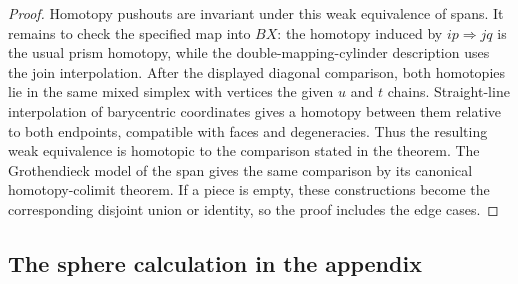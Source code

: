 \documentclass[11pt,a4paper]{article}
\theoremstyle{definition}
\theoremstyle{remark}
\begin{document}
\begin{proof}
Homotopy pushouts are invariant under this weak equivalence of spans. It remains to check the specified map into $BX$: the homotopy induced by $ip\Rightarrow jq$ is the usual prism homotopy, while the double-mapping-cylinder description uses the join interpolation. After the displayed diagonal comparison, both homotopies lie in the same mixed simplex with vertices the given $u$ and $t$ chains. Straight-line interpolation of barycentric coordinates gives a homotopy between them relative to both endpoints, compatible with faces and degeneracies. Thus the resulting weak equivalence is homotopic to the comparison stated in the theorem. The Grothendieck model of the span gives the same comparison by its canonical homotopy-colimit theorem. If a piece is empty, these constructions become the corresponding disjoint union or identity, so the proof includes the edge cases.
\end{proof}

\subsection{The sphere calculation in the appendix}
\end{document}
